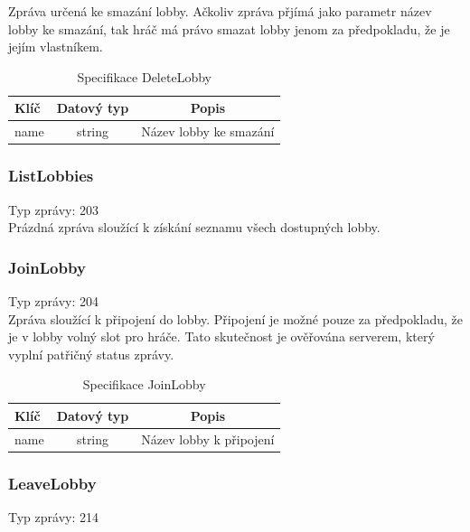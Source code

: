 \documentclass[12pt, a4paper]{article}
\begin{document}
    Zpráva určená ke smazání lobby.
    Ačkoliv zpráva přjímá jako parametr název lobby ke smazání, tak hráč má právo smazat lobby jenom za předpokladu, že je jejím vlastníkem.

    \begin{table}[H]
        \centering
        \begin{tabular}{|l|c|c|}
            \hline
            Klíč & Datový typ & Popis\\
            \hline
            \hline
            name & string & Název lobby ke smazání\\
            \hline
        \end{tabular}
        \caption{Specifikace DeleteLobby}
    \end{table}

    \subsubsection*{ListLobbies}
    Typ zprávy: 203\\

    Prázdná zpráva sloužící k získání seznamu všech dostupných lobby.

    \subsubsection*{JoinLobby}
    Typ zprávy: 204\\

    Zpráva sloužící k připojení do lobby.
    Připojení je možné pouze za předpokladu, že je v lobby volný slot pro hráče.
    Tato skutečnost je ověřována serverem, který vyplní patřičný status zprávy.

    \begin{table}[H]
        \centering
        \begin{tabular}{|l|c|c|}
            \hline
            Klíč & Datový typ & Popis\\
            \hline
            \hline
            name & string & Název lobby k připojení\\
            \hline
        \end{tabular}
        \caption{Specifikace JoinLobby}
    \end{table} 

    \subsubsection*{LeaveLobby}
    Typ zprávy: 214\\
\end{document}
